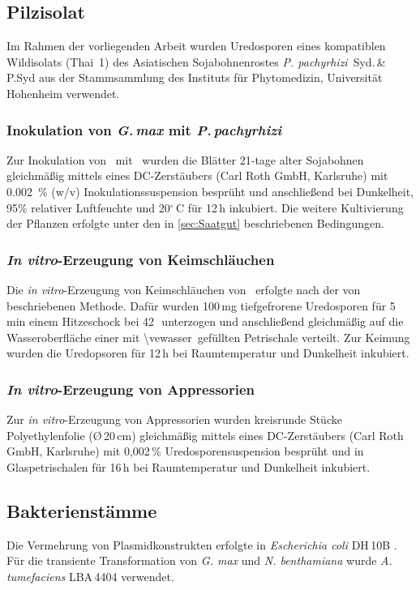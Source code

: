 \subsection{Pilzisolat}
Im Rahmen der vorliegenden Arbeit wurden Uredosporen eines kompatiblen Wildisolats (Thai~1) des Asiatischen Sojabohnenrostes \textit{ P. pachyrhizi} \,Syd.\,\&\,P.Syd aus der Stammsammlung des Instituts für Phytomedizin, Universität Hohenheim verwendet.
\subsubsection{Inokulation von \textit{G.\,max} mit \textit{P.\,pachyrhizi}} 
Zur Inokulation von \Gmax\ mit \Ppach\ wurden die Blätter 21-tage alter Sojabohnen gleichmäßig mittels eines DC-Zerstäubers (Carl Roth GmbH, Karlsruhe) mit \SI{0,002}{\%} (w/v) Inokulationssuspension besprüht und anschließend bei Dunkelheit, 95\% relativer Luftfeuchte und 20$^\circ$\,C für 12\,h inkubiert. Die weitere Kultivierung der Pflanzen erfolgte unter den in \ref{sec:Saatgut} beschriebenen Bedingungen.
\subsubsection{\textit{In vitro}-Erzeugung von Keimschläuchen}
Die \textit{in vitro}-Erzeugung von Keimschläuchen von \Ppach\ erfolgte nach der von \citet{PosadaBuitrago.2005} beschriebenen Methode. Dafür wurden 100\,mg tiefgefrorene Uredosporen für 5\,min einem Hitzeschock bei 42\,\celcius\ unterzogen und anschließend gleichmäßig auf die Wasseroberfläche einer mit \acs{\vewasser}\ gefüllten Petrischale verteilt. Zur Keimung wurden die Uredopsoren für 12\,h bei Raumtemperatur und Dunkelheit inkubiert.
\subsubsection{\textit{In vitro}-Erzeugung von  Appressorien }
Zur \textit{in vitro}-Erzeugung von Appressorien wurden kreisrunde Stücke Polyethylenfolie (\O\,20\,cm)  gleichmäßig mittels eines DC-Zerstäubers (Carl Roth GmbH, Karlsruhe) mit 0,002\,\% Uredosporensuspension besprüht und in Glaspetrischalen für 16\,h bei Raumtemperatur und Dunkelheit inkubiert. 
\subsection{Bakterienstämme}
Die Vermehrung von Plasmidkonstrukten erfolgte in \textit{Escherichia coli} DH\,10B \citep{Grant.1990}.
Für die transiente Transformation von \textit{G. max} und \textit{N. benthamiana} wurde \textit{A. tumefaciens } LBA\,4404 \citep{Ooms.1981} verwendet. 
